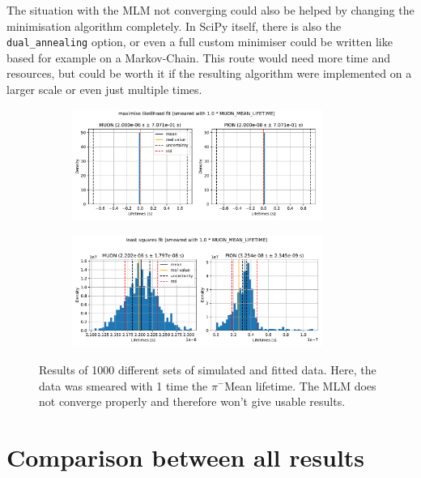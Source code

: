 \documentclass[11pt, a4paper, oneside]{book}
\newcommand\DoublePlotwidth{0.9}
\newcommand{\pion}{$\pi^{-}$}
\begin{document}
The situation with the MLM not converging could also be helped by changing the minimisation algorithm completely. In SciPy itself, there is also the \lstinline{dual_annealing} option, or even a full custom minimiser could be written like based for example on a Markov-Chain. This route would need more time and resources, but could be worth it if the resulting algorithm were implemented on a larger scale or even just multiple times.

\begin{figure}[h]
\begin{subfigure}{\textwidth}
  \centering
  \includegraphics[width=\DoublePlotwidth\textwidth]{images/4b_hist_2_likelihood.pdf}
\end{subfigure}

\begin{subfigure}{\textwidth}
  \centering
  \includegraphics[width=\DoublePlotwidth\textwidth]{images/4b_hist_2_squares.pdf}
\end{subfigure}
\caption{Results of 1000 different sets of simulated and fitted data. Here, the data was smeared with 1 time the \pion Mean lifetime. The MLM does not converge properly and therefore won't give usable results.}
\label{fig:results_smeared_2}
\end{figure}

\FloatBarrier
\section{Comparison between all results}
\end{document}
